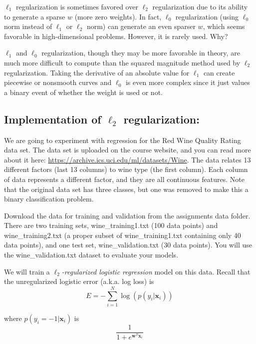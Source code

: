 \problem[4]
$\ell_1$ regularization is sometimes favored over $\ell_2$ regularization due to its ability to generate a sparse $w$ (more zero weights).
In fact, $\ell_0$ regularization (using $\ell_0$ norm instead of $\ell_1$ or $\ell_2$ norm) can generate an even sparser $w$, which seems favorable in high-dimensional problems.
However, it is rarely used.  Why?

\begin{solution}
  $\ell_1$ and $\ell_0$ regularization, though they may be more favorable in theory, are much more difficult to compute than the squared magnitude method used by $\ell_2$ regularization. Taking the derivative of an absolute value for $\ell_1$ can create piecewise or nonsmooth curves and $\ell_0$ is even more complex since it just values a binary event of whether the weight is used or not. 
\end{solution}

\subsection{Implementation of \texorpdfstring{$\ell_2$}{L2} regularization:}

We are going to experiment with regression for the Red Wine Quality Rating data set. The data set is uploaded on the course website, and you can read more about it here: \url{https://archive.ics.uci.edu/ml/datasets/Wine}. The data relates 13 different factors (last 13 columns) to wine type (the first column). Each column of data represents a different factor, and they are all continuous features. Note that the original data set has three classes, but one was removed to make this a binary classification problem.

Download the data for training and validation from the assignments data folder.
There are two training sets,
wine\_training1.txt (100 data points) and wine\_training2.txt (a proper subset of wine\_training1.txt containing only 40 data points), and one test set, wine\_validation.txt (30 data points). You will use the wine\_validation.txt dataset to evaluate your models.

We will train a \emph{$\ell_2$-regularized logistic regression} model on this data. Recall that the unregularized logistic error (a.k.a. log loss) is
\[E = -\sum_{i=1}^{N}\log(p(y_i | \mathbf{x}_i))\]

where $p(y_i = -1 | \mathbf{x}_i)$ is
\[\frac{1}{1 + e^{\mathbf{w}^T\mathbf{x}_i}}\]

